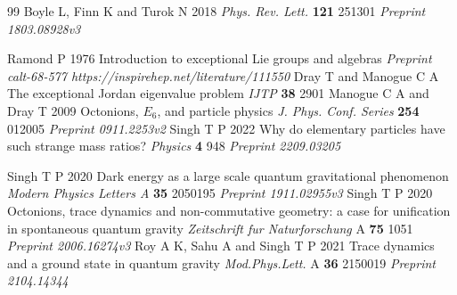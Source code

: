 \documentclass[a4paper]{jpconf}
\begin{document}
\begin{thebibliography}{99}
 Boyle L, Finn K and Turok N 2018 	{ \it Phys. Rev. Lett.} {\bf 121}  251301 {\it Preprint 1803.08928v3}

 Ramond P 1976 Introduction to exceptional Lie groups and algebras {\it Preprint calt-68-577 https://inspirehep.net/literature/111550}
 Dray T and Manogue C A The exceptional Jordan eigenvalue problem {\it IJTP} {\bf 38} 2901
 Manogue C A and Dray T 2009 Octonions, $E_6$, and particle physics {\it J. Phys. Conf. Series} {\bf 254} 012005    {\it Preprint 0911.2253v2}
 Singh T P 2022 Why do elementary particles have such strange mass ratios? {\it Physics} {\bf 4} 948  {\it Preprint 2209.03205}


 Singh T P 2020 Dark energy as a large scale quantum gravitational phenomenon {\it Modern Physics Letters A} {\bf 35}  2050195 {\it Preprint 1911.02955v3}
 Singh T P 2020 Octonions, trace dynamics and non-commutative geometry: a case for unification in spontaneous quantum gravity {\it Zeitschrift fur Naturforschung} A {\bf 75} 1051 {\it Preprint 2006.16274v3}
 Roy A K, Sahu A and Singh T P 2021 Trace dynamics and a ground state in quantum gravity {\it Mod.Phys.Lett.} A {\bf 36} 2150019 {\it Preprint 2104.14344}
\end{thebibliography} 
\end{document}
